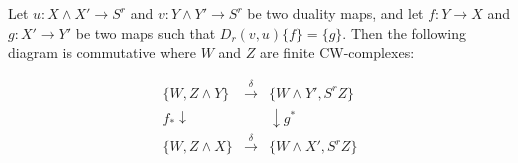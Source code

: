 Let $u: X \wedge X' \rightarrow S^r$ and $v: Y \wedge Y' \rightarrow S^r$ be two duality maps, and let $f: Y \rightarrow X$ and $g: X' \rightarrow Y'$ be two maps such that $D_r(v, u)\{f\} = \{g\}$. Then the following diagram is commutative where $W$ and $Z$ are finite CW-complexes:

$$\begin{array}{ccc}
\{W, Z \wedge Y\} & \xrightarrow{\delta} & \{W \wedge Y', S^r Z\} \\
f_* \downarrow & & \downarrow g^* \\
\{W, Z \wedge X\} & \xrightarrow{\delta} & \{W \wedge X', S^r Z\}
\end{array}$$

